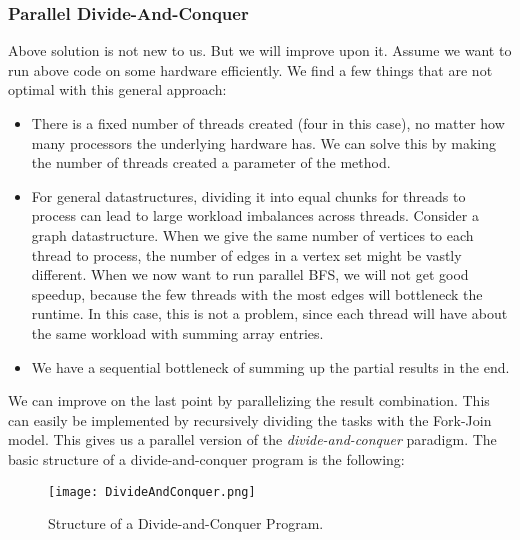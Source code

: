 \documentclass[main.tex]{subfiles}
\begin{document}
\subsubsection{Parallel Divide-And-Conquer}
Above solution is not new to us. But we will improve upon it. Assume we want to run above code on some hardware efficiently. We find a few things that are not optimal with this general approach:
\begin{itemize}
  \item There is a fixed number of threads created (four in this case), no matter how many processors the underlying hardware has. We can solve this by making the number of threads created a parameter of the method.
  \item For general datastructures, dividing it into equal chunks for threads to process can lead to large workload imbalances across threads. Consider a graph datastructure. When we give the same number of vertices to each thread to process, the number of edges in a vertex set might be vastly different. When we now want to run parallel BFS, we will not get good speedup, because the few threads with the most edges will bottleneck the runtime. In this case, this is not a problem, since each thread will have about the same workload with summing array entries.
  \item We have a sequential bottleneck of summing up the partial results in the end.
\end{itemize}
We can improve on the last point by parallelizing the result combination. This can easily be implemented by recursively dividing the tasks with the Fork-Join model. This gives us a parallel version of the \textit{divide-and-conquer} paradigm. The basic structure of a divide-and-conquer program is the following:

\begin{figure}[H]
    \centering
    \texttt{[image: DivideAndConquer.png]}
    \caption{Structure of a Divide-and-Conquer Program.}
\end{figure}
\end{document}
